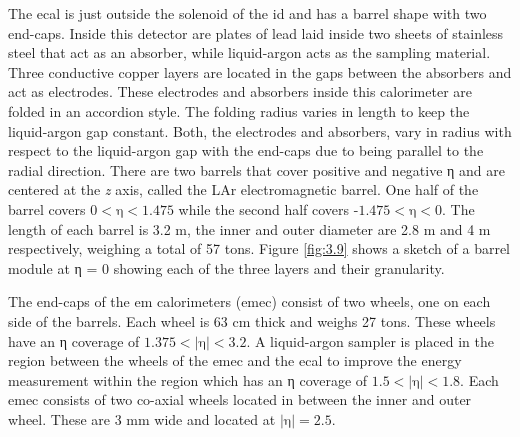 The \gls{ecal} is just outside the solenoid of the \gls{id} and has a barrel shape with two end-caps. Inside this detector are plates
of lead laid inside two sheets of stainless steel that act as an absorber, while liquid-argon acts as the sampling material. Three 
conductive copper layers are located in the gaps between the absorbers and act as electrodes.
These electrodes and absorbers inside this calorimeter are folded in an accordion style. The folding radius varies in length to keep the liquid-argon gap constant. 
Both, the electrodes and absorbers, vary in radius with respect to the liquid-argon gap with the end-caps due to being parallel to the radial 
direction. There are two barrels that cover positive and negative η and are centered at the \textit{z} axis, called the LAr electromagnetic barrel.
One half of the barrel covers $\textrm{0} < \textrm{η} < \textrm{1.475} $ while the second half covers $\textrm{-1.475} < \textrm{η} < \textrm{0}$. The length of 
each barrel is 3.2 m, the inner and outer diameter are 2.8 m and 4 m respectively, weighing a total of 57 tons. Figure \ref{fig:3.9} 
shows a sketch of a barrel module at η = 0 showing each of the three layers and their granularity. 
\par
The end-caps of the \gls{em} calorimeters (\gls{emec}) consist of two wheels, one on each side of the barrels. Each wheel 
is 63 cm thick and weighs 27 tons. These wheels have an η coverage of $\textrm{1.375} < |\textrm{η}| < \textrm{3.2}$. A liquid-argon 
sampler is placed in the region between the wheels of the \gls{emec} and the \gls{ecal} to improve the energy measurement within 
the region which has an η coverage of $\textrm{1.5} < |\textrm{η}| < \textrm{1.8}$. Each \gls{emec} consists of two co-axial wheels located 
in between the inner and outer wheel. These are 3 mm wide and located at $|\textrm{η}|=\textrm{2.5}$.  


